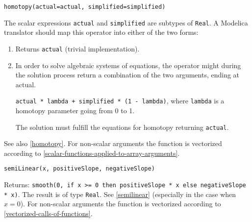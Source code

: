\begin{operatordefinition}[homotopy]
\begin{synopsis}\begin{lstlisting}
homotopy(actual=actual, simplified=simplified)
\end{lstlisting}\end{synopsis}
\begin{semantics}
The scalar expressions \lstinline!actual! and \lstinline!simplified! are subtypes of \lstinline!Real!.  A Modelica translator should map this operator into either of the two forms:
\begin{enumerate}
\item
  Returns \lstinline!actual! (trivial implementation).
\item
  In order to solve algebraic systems of equations, the operator might during the solution process return a combination of the two arguments, ending at actual.
  \begin{example}
  \lstinline!actual * lambda + simplified * (1 - lambda)!, where \lstinline!lambda! is a homotopy parameter going from 0 to 1.
  \end{example}
  The solution must fulfill the equations for homotopy returning \lstinline!actual!.
\end{enumerate}
See also \cref{homotopy}.  For non-scalar arguments the function is vectorized according to \cref{scalar-functions-applied-to-array-arguments}.
\end{semantics}
\end{operatordefinition}

\begin{operatordefinition}[semiLinear]
\begin{synopsis}\begin{lstlisting}
semiLinear(x, positiveSlope, negativeSlope)
\end{lstlisting}\end{synopsis}
\begin{semantics}
Returns: \lstinline!smooth(0, if x >= 0 then positiveSlope * x else negativeSlope * x)!.  The result is of type \lstinline!Real!.  See \cref{semilinear} (especially in the case when $x = 0$).  For non-scalar arguments the function is vectorized according to \cref{vectorized-calls-of-functions}.
\end{semantics}
\end{operatordefinition}

